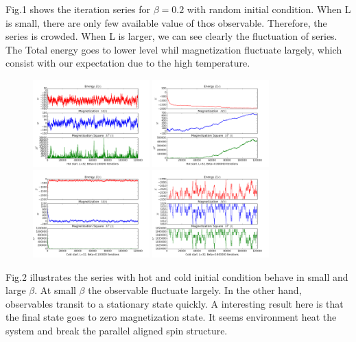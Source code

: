 \documentclass[12pt]{article}
\begin{document}
Fig.1 shows the iteration series for $\beta=0.2$ with random initial condition. When L is small, there are only few available value of thos observable. Therefore, the series is crowded. When L is larger, we can see clearly the fluctuation of series. The Total energy goes to lower level whil magnetization fluctuate largely, which consist with our expectation due to the high temperature.

\begin{figure}[h!]
	\begin{center}
		\includegraphics[width=0.4\textwidth]{exp1/Hot_L_32_Beta_1_iter_120000.png}
		\includegraphics[width=0.4\textwidth]{exp1/Hot_L_32_Beta_8_iter_120000.png}
		\includegraphics[width=0.4\textwidth]{exp1/Cold_L_32_Beta_1_iter_120000.png}
		\includegraphics[width=0.4\textwidth]{exp1/Cold_L_32_Beta_8_iter_120000.png}
		\caption{}
		\label{fig2}
	\end{center}
\end{figure}
Fig.2 illustrates the series with hot and cold initial condition behave in small and large $\beta$. At small $\beta$ the observable fluctuate largely. In the other hand, observables transit to a stationary state quickly. A interesting result here is that the final state goes to zero magnetization state. It seems environment heat the system and break the parallel aligned spin structure.
\end{document}
